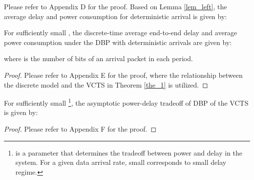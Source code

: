 \documentclass[11pt,journal, onecolumn]{./IEEEtran}
\newcommand{\blue}{\color{black}}
\newcommand{\red}{\color{black}}
\begin{document}
Please refer to Appendix D for the proof. Based on Lemma \ref{lem_left}, the average delay and power consumption for deterministic arrival is given by:

\begin{Theorem}\label{the_dpbound} {\red For sufficiently small ,} the discrete-time average end-to-end delay  and average power consumption  under the DBP  with deterministic arrivals are given by:


where  is the number of bits of an arrival packet in each period. ~\hfill\IEEEQED
\end{Theorem}
\begin{proof}
Please refer to Appendix E for the proof, {\red where the relationship between the discrete model and the VCTS in Theorem \ref{the_1} is utilized.}
\end{proof}
\begin{Corollary}\label{cor_order} {\red For sufficiently small }\footnote{\red  is a parameter that determines the tradeoff between power and delay in the system. For a given data arrival rate, small  corresponds to small delay regime.}, the asymptotic power-delay tradeoff of DBP  {\blue of the VCTS} is given by:


\end{Corollary}
\begin{proof}
Please refer to Appendix F for the proof.
\end{proof}
\end{document}
